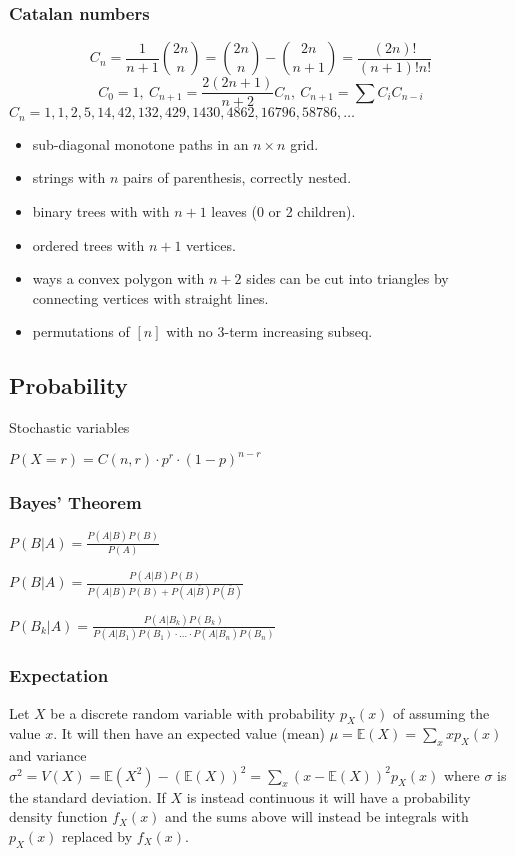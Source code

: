 \documentclass[
	a4paper,
	landscape,
	10pt,
]{article}
\begin{document}
\begin{multicols}{3}
	\subsubsection*{Catalan numbers}
		\[ C_n=\frac{1}{n+1}\binom{2n}{n}= \binom{2n}{n}-\binom{2n}{n+1} = \frac{(2n)!}{(n+1)!n!} \]
		\[ C_0=1,\ C_{n+1} = \frac{2(2n+1)}{n+2}C_n,\ C_{n+1}=\sum C_iC_{n-i} \]
		${C_n = 1, 1, 2, 5, 14, 42, 132, 429, 1430, 4862, 16796, 58786, \dots}$
		\begin{itemize}[noitemsep]
			\item sub-diagonal monotone paths in an $n\times n$ grid.
			\item strings with $n$ pairs of parenthesis, correctly nested.
			\item binary trees with with $n+1$ leaves (0 or 2 children).
			\item ordered trees with $n+1$ vertices.
			\item ways a convex polygon with $n+2$ sides can be cut into triangles by connecting vertices with straight lines.
			\item permutations of $[n]$ with no 3-term increasing subseq.
		\end{itemize}

    \subsection{Probability} Stochastic variables

        $P(X=r) = C(n,r) \cdot p^r \cdot (1-p)^{n-r}$

        \subsubsection*{Bayes' Theorem}

        $P(B|A) = \frac{P(A|B) P(B)}{P(A)}$
        
        $P(B|A) = \frac{P(A|B)P(B)}{P(A|B)P(B) + P(A|\bar{B})P(\bar{B})}$
        
        $P(B_k|A) = \frac{P(A|B_k)P(B_k)}{P(A|B_1)P(B_1) \cdot ... \cdot P(A|B_n)P(B_n)}$

        \subsubsection*{Expectation}

        Let $X$ be a discrete random variable with probability $p_X(x)$ of assuming the value $x$. It will then have an expected value (mean) $\mu=\mathbb{E}(X)=\sum_xxp_X(x)$ and variance $\sigma^2=V(X)=\mathbb{E}(X^2)-(\mathbb{E}(X))^2=\sum_x(x-\mathbb{E}(X))^2p_X(x)$ where $\sigma$ is the standard deviation. If $X$ is instead continuous it will have a probability density function $f_X(x)$ and the sums above will instead be integrals with $p_X(x)$ replaced by $f_X(x)$.


\end{multicols}
\end{document}
